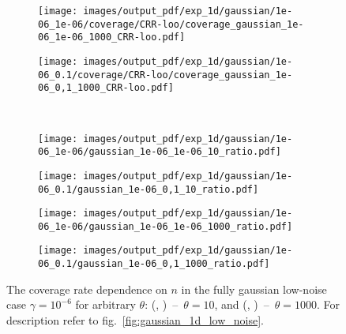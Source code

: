 \documentclass[a4paper,14pt]{extarticle}
\begin{document}
\begin{figure}
\begin{subfigure}[b]{0.25\linewidth}
  \end{subfigure}%
  \begin{subfigure}[b]{0.25\linewidth}
    \texttt{[image: images/output\_pdf/exp\_1d/gaussian/1e-06\_1e-06/coverage/CRR-loo/coverage\_gaussian\_1e-06\_1e-06\_1000\_CRR-loo.pdf]}
  \end{subfigure}%
  \begin{subfigure}[b]{0.25\linewidth}
    \texttt{[image: images/output\_pdf/exp\_1d/gaussian/1e-06\_0.1/coverage/CRR-loo/coverage\_gaussian\_1e-06\_0,1\_1000\_CRR-loo.pdf]}
  \end{subfigure}\\
  \begin{subfigure}[b]{0.25\linewidth}
    \texttt{[image: images/output\_pdf/exp\_1d/gaussian/1e-06\_1e-06/gaussian\_1e-06\_1e-06\_10\_ratio.pdf]}
    \caption{} \label{fig:gaussian_1d_low_noise_arb_c1}
  \end{subfigure}%
  \begin{subfigure}[b]{0.25\linewidth}
    \texttt{[image: images/output\_pdf/exp\_1d/gaussian/1e-06\_0.1/gaussian\_1e-06\_0,1\_10\_ratio.pdf]}
    \caption{} \label{fig:gaussian_1d_low_noise_arb_c2}
  \end{subfigure}%
  \begin{subfigure}[b]{0.25\linewidth}
    \texttt{[image: images/output\_pdf/exp\_1d/gaussian/1e-06\_1e-06/gaussian\_1e-06\_1e-06\_1000\_ratio.pdf]}
    \caption{} \label{fig:gaussian_1d_low_noise_arb_c3}
  \end{subfigure}%
  \begin{subfigure}[b]{0.25\linewidth}
    \texttt{[image: images/output\_pdf/exp\_1d/gaussian/1e-06\_0.1/gaussian\_1e-06\_0,1\_1000\_ratio.pdf]}
    \caption{} \label{fig:gaussian_1d_low_noise_arb_c4}
  \end{subfigure}%
  \caption{The coverage rate dependence on $n$ in the fully gaussian low-noise case $\gamma=10^{-6}$
  for arbitrary $\theta$:
  (, )~--~$\theta=10$,
  and (, )~--~$\theta=1000$.
  For description refer to fig.~\ref{fig:gaussian_1d_low_noise}.}
  \label{fig:gaussian_1d_low_noise_arb}
\end{figure}
\end{document}
